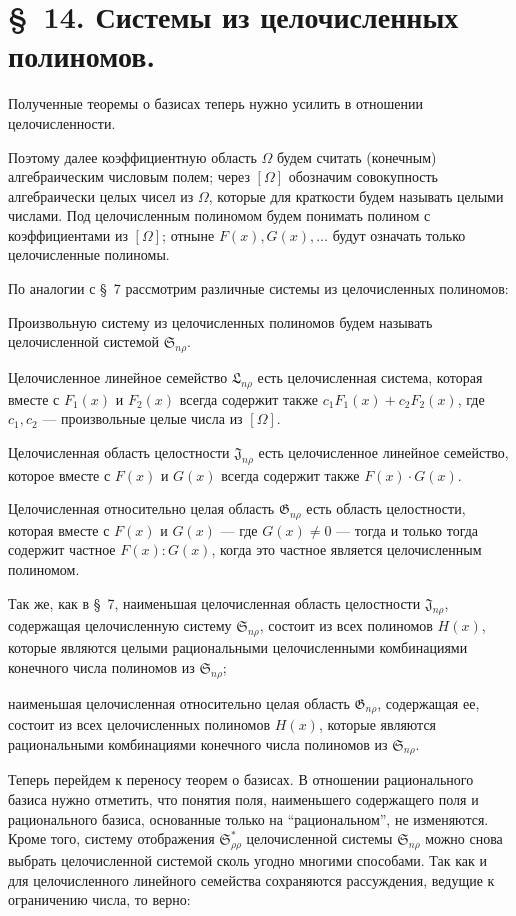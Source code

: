 \documentclass[11pt]{article}
\providecommand{\Ssys}{\mathfrak{S}}
\providecommand{\Jdom}{\mathfrak{J}}
\providecommand{\Gdom}{\mathfrak{G}}
\providecommand{\Lsys}{\mathfrak{L}}
\begin{document}
\section*{\S\ 14. Системы из целочисленных полиномов.}

Полученные теоремы о базисах теперь нужно усилить в отношении целочисленности.

Поэтому далее коэффициентную область $\Omega$ будем считать (конечным) алгебраическим числовым полем; через $[\Omega]$ обозначим совокупность алгебраически целых чисел из $\Omega$, которые для краткости будем называть целыми числами. Под целочисленным полиномом будем понимать полином с коэффициентами из $[\Omega]$; отныне $F(x),G(x),\ldots$ будут означать только целочисленные полиномы.

По аналогии с \S\ 7 рассмотрим различные системы из целочисленных полиномов:

Произвольную систему из целочисленных полиномов будем называть целочисленной системой $\Ssys_{n\rho}$.

Целочисленное линейное семейство $\Lsys_{n\rho}$ есть целочисленная система, которая вместе с $F_1(x)$ и $F_2(x)$ всегда содержит также $c_1F_1(x)+c_2F_2(x)$, где $c_1,c_2$ --- произвольные целые числа из $[\Omega]$.

Целочисленная область целостности $\Jdom_{n\rho}$ есть целочисленное линейное семейство, которое вместе с $F(x)$ и $G(x)$ всегда содержит также $F(x)\cdot G(x)$.

Целочисленная относительно целая область $\Gdom_{n\rho}$ есть область целостности, которая вместе с $F(x)$ и $G(x)$ --- где $G(x)\ne0$ --- тогда и только тогда содержит частное $F(x):G(x)$, когда это частное является целочисленным полиномом.

Так же, как в \S\ 7, наименьшая целочисленная область целостности $\Jdom_{n\rho}$, содержащая целочисленную систему $\Ssys_{n\rho}$, состоит из всех полиномов $H(x)$, которые являются целыми рациональными целочисленными комбинациями конечного числа полиномов из $\Ssys_{n\rho}$;

наименьшая целочисленная относительно целая область $\Gdom_{n\rho}$, содержащая ее, состоит из всех целочисленных полиномов $H(x)$, которые являются рациональными комбинациями конечного числа полиномов из $\Ssys_{n\rho}$.

Теперь перейдем к переносу теорем о базисах. В отношении рационального базиса нужно отметить, что понятия поля, наименьшего содержащего поля и рационального базиса, основанные только на ``рациональном'', не изменяются. Кроме того, систему отображения $\Ssys^*_{\rho\rho}$ целочисленной системы $\Ssys_{n\rho}$ можно снова выбрать целочисленной системой сколь угодно многими способами. Так как и для целочисленного линейного семейства сохраняются рассуждения, ведущие к ограничению числа, то верно:
\end{document}
